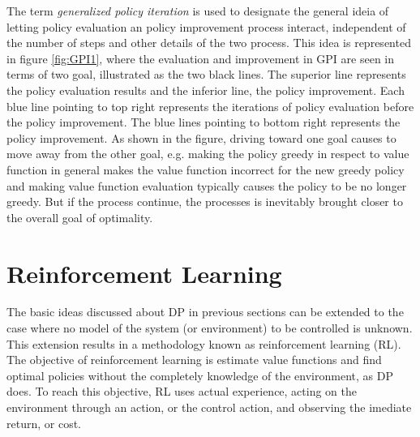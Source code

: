 The term \textit{generalized policy iteration} is used to designate the general ideia of letting policy evaluation an policy improvement process interact, independent of the number of steps and other details of the two process. This idea is represented in figure \ref{fig:GPI1}, where the evaluation and improvement in GPI are seen in terms of two goal, illustrated as the two black lines. The superior line represents the policy evaluation results and the inferior line, the policy improvement. Each blue line pointing to top right represents the iterations of policy evaluation before the policy improvement. The blue lines pointing to bottom right represents the policy improvement. As shown in the figure, driving toward one goal causes to move away from the other goal, e.g. making the policy greedy in respect to value function in general makes the value function incorrect for the new greedy policy and making value function evaluation typically causes the policy to be no longer greedy. But if the process continue, the processes is inevitably brought closer to the overall goal of optimality.


\section{Reinforcement Learning}
\label{sec:RL}

The basic ideas discussed about DP in previous sections can be extended to the case where no model of the system (or environment) to be controlled is unknown. This extension results in a methodology known as reinforcement learning (RL). The objective of reinforcement learning is estimate value functions and find optimal policies without the completely knowledge of the environment, as DP does. To reach this objective, RL uses actual experience, acting on the environment through an action, or the control action, and observing the imediate return, or cost.

